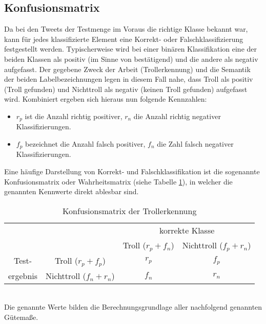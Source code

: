 \subsection{Konfusionsmatrix}
Da bei den Tweets der Testmenge im Voraus die richtige Klasse bekannt war, kann für jedes klassifizierte Element eine Korrekt- oder Falschklassifizierung festgestellt werden. Typischerweise wird bei einer binären Klassifikation eine der beiden Klassen als positiv (im Sinne von \glqq bestätigend\grqq) und die andere als negativ aufgefasst. Der gegebene Zweck der Arbeit (Trollerkennung) und die Semantik der beiden Labelbezeichnungen legen in diesem Fall nahe, dass \glqq Troll\grqq{} als positiv (\glqq Troll gefunden\grqq) und \glqq Nichttroll\grqq{} als negativ (\glqq keinen Troll gefunden\grqq) aufgefasst wird. Kombiniert ergeben sich hieraus nun folgende Kennzahlen:
\begin{itemize}
\item $r_p$ ist die Anzahl richtig positiver, $r_n$ die Anzahl richtig negativer Klassifizierungen.
\item $f_p$ bezeichnet die Anzahl falsch positiver, $f_n$ die Zahl falsch negativer Klassifizierungen.
\end{itemize}
Eine häufige Darstellung von Korrekt- und Falschklassifikation ist die sogenannte Konfusionsmatrix oder Wahrheitsmatrix (siehe Tabelle \ref{confusion_matrix}), in welcher die genannten Kennwerte direkt ablesbar sind.
\begin{table}[htb]
	\begin{center}
		\begin{tabular}{c|c|c|c|}
			\multicolumn{2}{c}{}&\multicolumn{2}{c}{korrekte Klasse}\\
			\cline{2-4}
			&&Troll ($r_p + f_n$)&Nichttroll ($f_p + r_n$)\\
			\cline{2-4}
			Test-& Troll ($r_p + f_p$) & $r_p$ & $f_p$\\
			\cline{2-4}
			ergebnis& Nichttroll ($f_n + r_n$) &$f_n$ & $r_n$\\
			\cline{2-4}
		\end{tabular}
		\caption{Konfusionsmatrix der Trollerkennung}\label{confusion_matrix}
	\end{center}
\end{table}\\
Die genannte Werte bilden die Berechnungsgrundlage aller nachfolgend genannten Gütemaße. 
